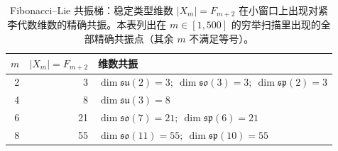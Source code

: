 \begin{table}[H]
\centering
\scriptsize
\setlength{\tabcolsep}{6pt}
\caption{Fibonacci--Lie 共振梯：稳定类型维数 $|X_m|=F_{m+2}$ 在小窗口上出现对紧李代数维数的精确共振。本表列出在 $m\in[1,500]$ 的穷举扫描里出现的全部精确共振点（其余 $m$ 不满足等号）。}
\label{tab:fibonacci_lie_resonance_ladder}
\begin{tabular}{r r l}
\toprule
$m$ & $|X_m|=F_{m+2}$ & 维数共振 \\
\midrule
2 & 3 & $\dim\mathfrak{su}(2)=3;\ \dim\mathfrak{so}(3)=3;\ \dim\mathfrak{sp}(2)=3$\\
4 & 8 & $\dim\mathfrak{su}(3)=8$\\
6 & 21 & $\dim\mathfrak{so}(7)=21;\ \dim\mathfrak{sp}(6)=21$\\
8 & 55 & $\dim\mathfrak{so}(11)=55;\ \dim\mathfrak{sp}(10)=55$\\
\bottomrule
\end{tabular}
\end{table}
